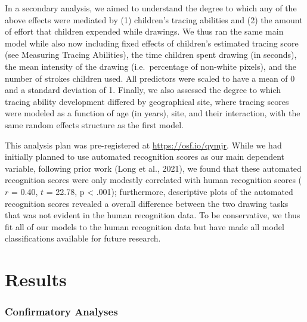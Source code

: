 \documentclass[
  english,
  man]{apa6}
\begin{document}
In a secondary analysis, we aimed to understand the degree to which any of the above effects were mediated by (1) children's tracing abilities and (2) the amount of effort that children expended while drawings. We thus ran the same main model while also now including fixed effects of children's estimated tracing score (see Measuring Tracing Abilities), the time children spent drawing (in seconds), the mean intensity of the drawing (i.e.~percentage of non-white pixels), and the number of strokes children used. All predictors were scaled to have a mean of 0 and a standard deviation of 1. Finally, we also assessed the degree to which tracing ability development differed by geographical site, where tracing scores were modeled as a function of age (in years), site, and their interaction, with the same random effects structure as the first model.

This analysis plan was pre-registered at \url{https://osf.io/qymjr}. While we had initially planned to use automated recognition scores as our main dependent variable, following prior work (Long et al., 2021), we found that these automated recognition scores were only modestly correlated with human recognition scores (\(r\) = 0.40, \(t\) = 22.78, p \textless{} .001); furthermore, descriptive plots of the automated recognition scores revealed a overall difference between the two drawing tasks that was not evident in the human recognition data. To be conservative, we thus fit all of our models to the human recognition data but have made all model classifications available for future research.

\hypertarget{results}{%
\section{Results}\label{results}}

\hypertarget{confirmatory-analyses}{%
\subsubsection{Confirmatory Analyses}\label{confirmatory-analyses}}
\end{document}
